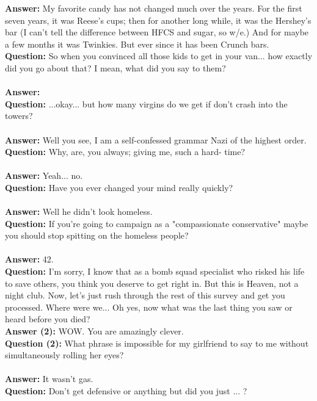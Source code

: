 \documentclass[a4paper]{article}
\begin{document}
\textbf{Answer:} My favorite candy has not changed much over the years. For the first seven years, it was Reese's cups; then for another long while, it was the Hershey's bar (I can't tell the difference between HFCS and sugar, so w/e.) And for maybe a few months it was Twinkies. But ever since it has been Crunch bars. \\
\textbf{Question:} So when you convinced all those kids to get in your van... how exactly did you go about that? I mean, what did you say to them? \\ \\
\textbf{Answer:}  \\
\textbf{Question:} ...okay... but how many virgins do we get if don't crash into the towers? \\ \\
\textbf{Answer:} Well you see, I am a self-confessed grammar Nazi of the highest order. \\
\textbf{Question:} Why, are, you always; giving me, such a hard- time? \\ \\
\textbf{Answer:} Yeah... no. \\
\textbf{Question:} Have you ever changed your mind really quickly? \\ \\
\textbf{Answer:} Well he didn't look homeless. \\
\textbf{Question:} If you're going to campaign as a "compassionate conservative" maybe you should stop spitting on the homeless people? \\ \\
\textbf{Answer:} 42. \\
\textbf{Question:} I'm sorry, I know that as a bomb squad specialist who risked his life to save others, you think you deserve to get right in. But this is Heaven, not a night club. Now, let's just rush through the rest of this survey and get you processed.
Where were we... Oh yes, now what was the last thing you saw or heard before you died? \\
\textbf{Answer (2):} WOW. You are amazingly clever. \\
\textbf{Question (2):} What phrase is impossible for my girlfriend to say to me without simultaneously rolling her eyes? \\ \\
\textbf{Answer:} It wasn't gas. \\
\textbf{Question:} Don't get defensive or anything but did you just ... ? \\ \\
\end{document}
